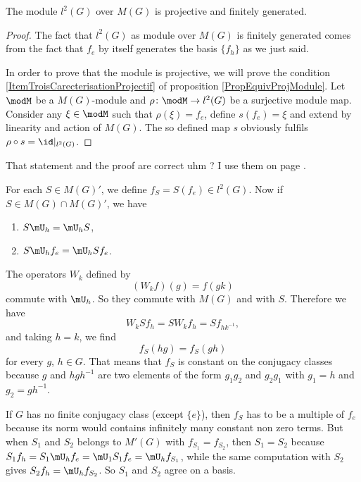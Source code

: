 \begin{proposition}		\label{ProplDeuxGFGP}
The module $l^2(G)$ over $M(G)$ is projective and finitely generated.
\end{proposition}

\begin{proof}
The fact that $l^2(G)$ as module over $M(G)$ is finitely generated comes from the fact that $f_e$ by itself generates the basis $\{ f_h \}$ as we just said. 

In order to prove that the module is projective, we will prove the condition \ref{ItemTroisCarecterisationProjectif} of proposition \ref{PropEquivProjModule}. Let $\modM$ be a $M(G)$-module and $\rho\colon \modM\to l^2(G)$ be a surjective module map. Consider any $\xi\in\modM$ such that $\rho(\xi)=f_e$, define $s(f_e)=\xi$ and extend by linearity and action of $M(G)$. The so defined map $s$ obviously fulfils $\rho\circ s=\id|_{l^2(G)}$.
\end{proof}

\begin{probleme}
That statement and the proof are correct uhm ? I use them on page \pageref{PglDeuxGFGPutiliseIci}.
\end{probleme}

For each $S\in M(G)'$, we define $f_S=S(f_e)\in l^2(G)$. Now if $S\in M(G)\cap M(G)'$, we have
\begin{enumerate}
\item $S\mU_h=\mU_hS$,
\item $S\mU_hf_e=\mU_hS f_e$.
\end{enumerate}
The operators $W_k$ defined by
\[ 
  (W_kf)(g)=f(gk)
\]
commute with $\mU_h$. So they commute with $M(G)$ and with $S$. Therefore we have
\[ 
  W_kSf_h=SW_kf_h=Sf_{hk^{-1}},
\]
and taking $h=k$, we find
\begin{equation}
  f_S(hg)=f_S(gh)
\end{equation}
for every $g$, $h\in G$. That means that $f_S$ is constant on the conjugacy classes because $g$ and $hgh^{-1}$ are two elements of the form $g_1g_2$ and $g_2g_1$ with $g_1=h$ and $g_2=gh^{-1}$.

If $G$ has no finite conjugacy class (except $\{ e \}$), then $f_S$ has to be a multiple of $f_e$ because its norm would contains infinitely many constant non zero terms. But when $S_1$ and $S_2$ belongs to $M'(G)$ with $f_{S_1}=f_{S_2}$, then $S_1=S_2$ because $S_1f_h=S_1\mU_hf_e=\mU_1S_1f_e=\mU_hf_{S_1}$, while the same computation with $S_2$ gives $S_2 f_h=\mU_hf_{S_2}$. So $S_1$ and $S_2$ agree on a basis.

